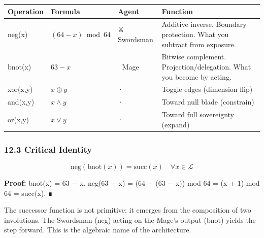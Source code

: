 \documentclass[
  11pt,
]{article}
\newcounter{none} %
\begin{document}
{\def\LTcaptype{none} %
\begin{longtable}[]{@{}
  >{\raggedright\arraybackslash}p{}
  >{\raggedright\arraybackslash}p{}
  >{\raggedright\arraybackslash}p{}
  >{\raggedright\arraybackslash}p{}@{}}
\toprule\noalign{}
\begin{minipage}[b]{\linewidth}\raggedright
Operation
\end{minipage} & \begin{minipage}[b]{\linewidth}\raggedright
Formula
\end{minipage} & \begin{minipage}[b]{\linewidth}\raggedright
Agent
\end{minipage} & \begin{minipage}[b]{\linewidth}\raggedright
Function
\end{minipage} \\
\midrule\noalign{}
\endhead
\bottomrule\noalign{}
\endlastfoot
neg(x) & \((64-x) \bmod 64\) & ⚔️ Swordsman & Additive inverse. Boundary
protection. What you subtract from exposure. \\
bnot(x) & \(63 - x\) & 🧙 Mage & Bitwise complement.
Projection/delegation. What you become by acting. \\
xor(x,y) & \(x \oplus y\) & · & Toggle edges (dimension flip) \\
and(x,y) & \(x \wedge y\) & · & Toward null blade (constrain) \\
or(x,y) & \(x \vee y\) & · & Toward full sovereignty (expand) \\
\end{longtable}
}

\subsubsection{12.3 Critical Identity}\label{critical-identity}

\[\text{neg}(\text{bnot}(x)) = \text{succ}(x) \quad \forall x \in \mathcal{L}\]

\textbf{Proof:} bnot(x) = 63 − x. neg(63 − x) = (64 − (63 − x)) mod 64 =
(x + 1) mod 64 = succ(x). ∎

The successor function is not primitive: it emerges from the composition
of two involutions. The Swordsman (neg) acting on the Mage's output
(bnot) yields the step forward. This is the algebraic name of the
architecture.
\end{document}
